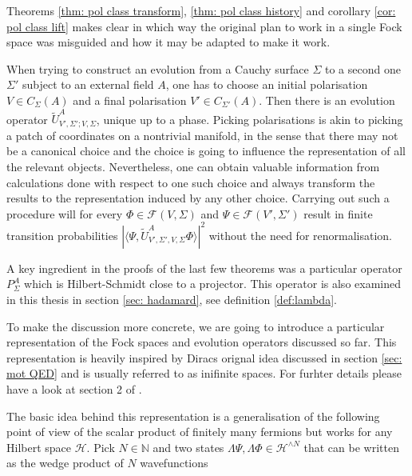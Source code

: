 \documentclass[b5paper,draft,openbib,12pt]{memoir}
\begin{document}
Theorems \ref{thm: pol class transform}, \ref{thm: pol class history}
and corollary \ref{cor: pol class lift} makes clear in which way
the original plan to work in a single Fock space was misguided and 
how it may be adapted to make it work.

When trying to construct an evolution from a Cauchy surface \(\Sigma\)
to a second one \(\Sigma'\) subject to an external field \(A\),
one has to choose an initial polarisation \(V\in C_{\Sigma}(A)\)
and a final polarisation \(V'\in C_{\Sigma'}(A)\). 
Then there is an evolution operator 
\(\tilde{U}^A_{V',\Sigma';V,\Sigma}\), unique up to a phase. 
Picking polarisations is akin to picking a patch 
of coordinates on a 
nontrivial manifold, in the sense that there may not be a 
canonical choice and the choice is going to influence the 
representation of all the relevant objects. Nevertheless,
one can obtain valuable information from calculations done 
with respect to one such choice and always transform the 
results to the representation induced by any other choice. 
Carrying out such a procedure will  for every 
\(\Phi\in \mathcal{F}(V,\Sigma)\) and 
\(\Psi\in \mathcal{F}(V',\Sigma')\) result in finite 
transition probabilities
\(|\langle \Psi, \tilde{U}^A_{V',\Sigma',V,\Sigma} \Phi\rangle |^2\)
without the need for renormalisation. 

A key ingredient in the proofs of the last few theorems was 
a particular operator \(P^A_\Sigma\) which is Hilbert-Schmidt
close to a projector. This operator is also examined in 
this thesis in section \ref{sec: hadamard}, 
see definition \ref{def:lambda}.

To make the discussion more concrete, we are going to 
introduce a particular representation of the Fock spaces 
and evolution operators discussed so far. This representation 
is heavily inspired by Diracs orignal idea discussed in section 
\ref{sec: mot QED} and is usually referred to as inifinite
spaces. For furhter details please have a look at section 2 of 
\cite{ivp0}. 

The basic idea behind this representation is a generalisation of 
the following point of view of the scalar product of finitely many 
fermions but works for any Hilbert space \(\mathcal{H}\). 
Pick \(N\in\mathbb{N}\) and two states 
\(\mathsf{\Lambda}\Psi,\mathsf{\Lambda}\Phi\in \mathcal{H}^{\wedge N}\) that can be written 
as the wedge product of \(N\) wavefunctions
\end{document}
